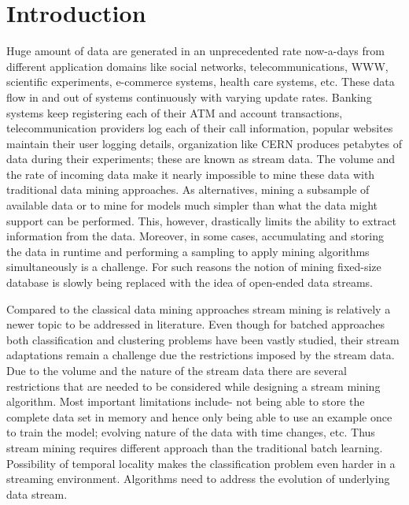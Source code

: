 \chapter{Introduction}
\label{chp:intro}
Huge amount of data are generated in an unprecedented rate now-a-days from different application domains like social networks, telecommunications, WWW, scientific experiments, e-commerce systems, health care systems, etc. These data flow in and out of systems continuously with varying update rates. Banking systems keep registering each of their ATM and account transactions, telecommunication providers log each of their call information, popular websites maintain their user logging details, organization like CERN produces petabytes of data during their experiments; these are known as stream data. The volume and the rate of incoming data make it nearly impossible to mine these data with traditional data mining approaches. As alternatives, mining a subsample of available data or to mine for models much simpler than what the data might support can be performed. This, however, drastically limits the ability to extract information from the data. Moreover, in some cases, accumulating and storing the data in runtime and performing a sampling to apply mining algorithms simultaneously is a challenge. For such reasons the notion of mining fixed-size database is slowly being replaced with the idea of open-ended data streams.

Compared to the classical data mining approaches stream mining is relatively a newer topic to be addressed in literature. Even though for batched approaches both classification and clustering problems have been vastly studied, their stream adaptations remain a challenge due the restrictions imposed by the stream data. Due to the volume and the nature of the stream data there are several restrictions that are needed to be considered while designing a stream mining algorithm. Most important limitations include- not being able to store the complete data set in memory and hence only being able to use an example once to train the model; evolving nature of the data with time changes, etc. Thus stream mining requires different approach than the traditional batch learning. Possibility of temporal locality makes the classification problem even harder in a streaming environment. Algorithms need to address the evolution of underlying data stream.

